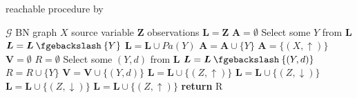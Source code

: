 \begin{algorithm}[htp!]
	\caption{reachable procedure by \citet{koller2007}}
	\label{alg:koller-d-separation}
	\begin{algorithmic}[1]
		\State $\mathcal{G}$ BN graph
		\State $X$ source variable
		\State $\boldsymbol{Z}$ observations
		\State
		\State $\boldsymbol{L}= \boldsymbol{Z}$ 
		\State $\boldsymbol{A} = \emptyset$
			\State Select some $Y$ from $\boldsymbol{L}$
			\State $\boldsymbol{L}=\boldsymbol{L} \mysetminus \{Y\}$
				\State $\boldsymbol{L} = \boldsymbol{L} \cup Pa(Y)$
			\EndIf
			\State $\boldsymbol{A}=\boldsymbol{A} \cup \{Y\}$
		\EndWhile
		\State
		\State $\boldsymbol{A} = \{(X, \uparrow)\} $ 
		\State $\boldsymbol{V} = \emptyset$
		\State $R = \emptyset$
			\State Select some $(Y,d)$ from $\boldsymbol{L}$
			\State $\boldsymbol{L} = \boldsymbol{L} \mysetminus \{(Y,d)\}$
					\State $R = R \cup \{Y\}$
				\EndIf
				\State $\boldsymbol{V} = \boldsymbol{V} \cup \{(Y,d)\}$
						\State $\boldsymbol{L} = \boldsymbol{L} \cup \{(Z,\uparrow)\}$
					\EndFor
						\State $\boldsymbol{L} = \boldsymbol{L} \cup \{(Z,\downarrow)\}$
					\EndFor
							\State $\boldsymbol{L} = \boldsymbol{L} \cup \{(Z,\downarrow)\}$
						\EndFor
					\EndIf
							\State $\boldsymbol{L} = \boldsymbol{L} \cup \{(Z,\uparrow)\}$
						\EndFor
					\EndIf
				\EndIf
			\EndIf
		\EndWhile
		\State \textbf{return} R
	\end{algorithmic}
\end{algorithm}

